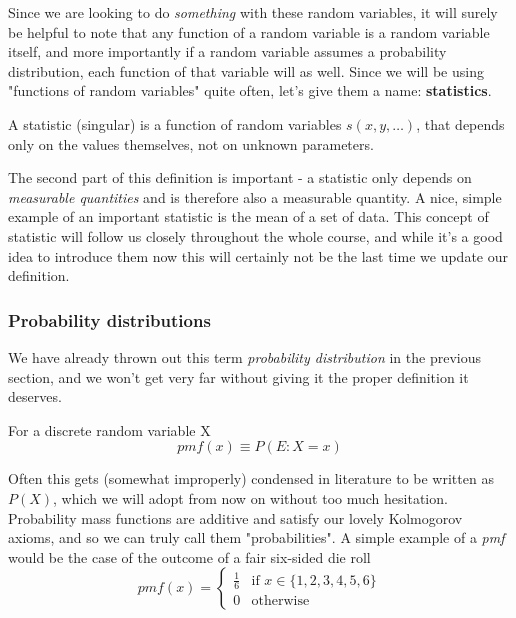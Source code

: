 Since we are looking to do \emph{something} with these random variables, it will surely be helpful to note that any function of a random variable is a random variable itself, and more importantly if a random variable assumes a probability distribution, each function of that variable will as well. Since we will be using "functions of random variables" quite often, let's give them a name: \textbf{statistics}.
\begin{definition}[Statistic]
	A statistic (singular) is a function of random variables $s(x,y,\dots)$, that depends only on the values themselves, not on unknown parameters. 
\end{definition}

The second part of this definition is important - a statistic only depends on \emph{measurable quantities} and is therefore also a measurable quantity. A nice, simple example of an important statistic is the mean of a set of data. This concept of statistic will follow us closely throughout the whole course, and while it's a good idea to introduce them now this will certainly not be the last time we update our definition.

\subsubsection{Probability distributions}
\label{subsubsec:pdf}

We have already thrown out this term \emph{probability distribution} in the previous section, and we won't get very far without giving it the proper definition it deserves. 

\begin{definition}
	For a discrete random variable X
	\[
	pmf(x)\equiv P(E:X=x)
	\]
\end{definition}

Often this gets (somewhat improperly) condensed in literature to be written as $P(X)$, which we will adopt from now on without too much hesitation. Probability mass functions are additive and satisfy our lovely Kolmogorov axioms, and so we can truly call them "probabilities". A simple example of a \emph{pmf} would be the case of the outcome of a fair six-sided die roll
	\[
	pmf(x) = \begin{cases} \frac{1}{6} & \text{if } x \in \{1,2,3,4,5,6\} \\ 0 &  \text{otherwise} \end{cases}
	\]


